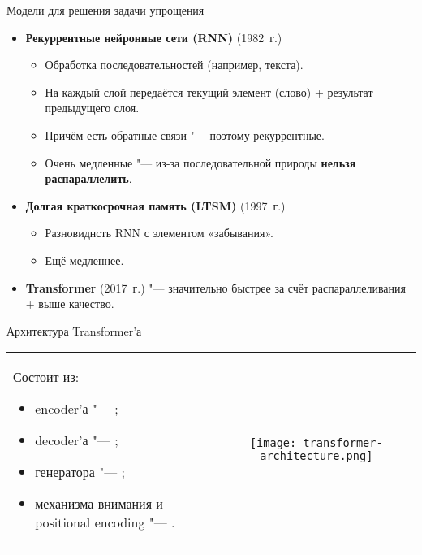 \begin{frame}[fragile]{Модели для решения задачи упрощения}%
  \begin{itemize}%
    \item \textbf{Рекуррентные нейронные сети (RNN)} (1982~г.)
      \begin{itemize}%
         \item Обработка последовательностей (например, текста).
         \item На каждый слой передаётся текущий элемент (слово) + результат предыдущего слоя.
         \item Причём есть обратные связи "--- поэтому рекуррентные.
         \item Очень медленные "--- из-за последовательной природы \textbf{нельзя распараллелить}.
       \end{itemize} 
    \item \textbf{Долгая краткосрочная память (LTSM)} (1997~г.)
      \begin{itemize}%
        \item Разновиднсть RNN с элементом «забывания».
        \item Ещё медленнее.
      \end{itemize}
    \item \textbf{Transformer} (2017~г.) "--- значительно быстрее за счёт распараллеливания + выше качество.
  \end{itemize}
\end{frame}


\begin{frame}[fragile]{Архитектура Transformer'а}%
  \noindent\begin{tabularx}{\textwidth}{LC}%
    Состоит из:
    \begin{itemize}%
       \item encoder'а
         "--- ;
       \item decoder'а
         "--- ;
       \item генератора
         "--- ;
       \item механизма внимания и positional encoding
         "--- .
     \end{itemize} & 
    \texttt{[image: transformer-architecture.png]}
  \end{tabularx}
\end{frame}


